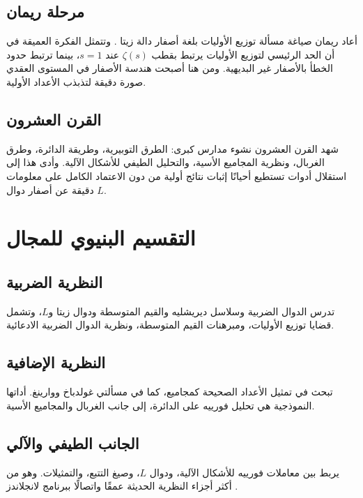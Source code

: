 \subsection{مرحلة ريمان}

أعاد ريمان صياغة مسألة توزيع الأوليات بلغة أصفار دالة زيتا
\cite{Riemann1859,Narkiewicz2000}. وتتمثل الفكرة العميقة في أن الحد الرئيسي
لتوزيع الأوليات يرتبط بقطب \(\zeta(s)\) عند \(s=1\)، بينما ترتبط حدود
الخطأ بالأصفار غير البديهية. ومن هنا أصبحت هندسة الأصفار في المستوى العقدي صورة دقيقة لتذبذب الأعداد الأولية.

\subsection{القرن العشرون}

شهد القرن العشرون نشوء مدارس كبرى: الطرق التوبيرية، وطريقة الدائرة، وطرق الغربال، ونظرية المجاميع الأسية، والتحليل الطيفي للأشكال الآلية. وأدى هذا إلى استقلال أدوات تستطيع أحيانًا إثبات نتائج أولية من دون الاعتماد الكامل على معلومات دقيقة عن أصفار دوال \(L\).

\section{التقسيم البنيوي للمجال}

\subsection{النظرية الضربية}

تدرس الدوال الضربية وسلاسل ديريشليه والقيم المتوسطة ودوال زيتا و\(L\)، وتشمل قضايا توزيع الأوليات، ومبرهنات القيم المتوسطة، ونظرية الدوال الضربية الادعائية.

\subsection{النظرية الإضافية}

تبحث في تمثيل الأعداد الصحيحة كمجاميع، كما في مسألتي غولدباخ ووارينغ. أداتها النموذجية هي تحليل فورييه على الدائرة، إلى جانب الغربال والمجاميع الأسية.

\subsection{الجانب الطيفي والآلي}

يربط بين معاملات فورييه للأشكال الآلية، ودوال \(L\)، وصيغ التتبع، والتمثيلات. وهو من أكثر أجزاء النظرية الحديثة عمقًا واتصالًا ببرنامج لانجلاندز
\cite{GelbartMiller2003,IwaniecKowalski2004}.


